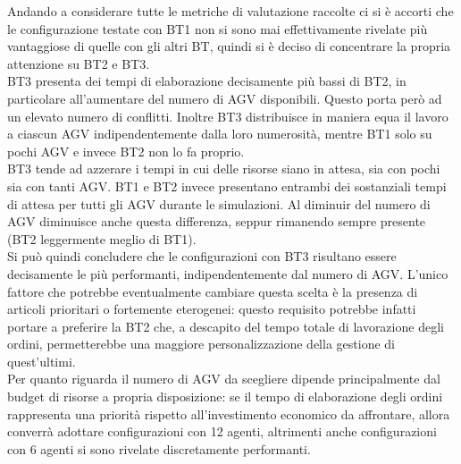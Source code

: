 \documentclass[12pt]{article}
\begin{document}
\noindent Andando a considerare tutte le metriche di valutazione raccolte ci si è accorti che le configurazione testate con BT1 non si sono mai effettivamente rivelate più vantaggiose di quelle con gli altri BT, quindi si è deciso di concentrare la propria attenzione su BT2 e BT3. \\

\noindent BT3 presenta dei tempi di elaborazione decisamente più bassi di BT2, in particolare all'aumentare del numero di AGV disponibili. Questo porta però ad un elevato numero di conflitti.
Inoltre BT3 distribuisce in maniera equa il lavoro a ciascun AGV indipendentemente dalla loro numerosità, mentre BT1 solo su pochi AGV e invece BT2 non lo fa proprio.\\
\noindent BT3 tende ad azzerare i tempi in cui delle risorse siano in attesa, sia con pochi sia con tanti AGV. BT1 e BT2 invece presentano entrambi dei sostanziali tempi di attesa per tutti gli AGV durante le simulazioni. Al diminuir del numero di AGV diminuisce anche questa differenza, seppur rimanendo sempre presente (BT2 leggermente meglio di BT1).\\

\noindent Si può quindi concludere che le configurazioni con BT3 risultano essere decisamente le più performanti, indipendentemente dal numero di AGV. L'unico fattore che potrebbe eventualmente cambiare questa scelta è la presenza di articoli prioritari o fortemente eterogenei: questo requisito potrebbe infatti portare a preferire la BT2 che, a descapito del tempo totale di lavorazione degli ordini, permetterebbe una maggiore personalizzazione della gestione di quest'ultimi.\\

\noindent Per quanto riguarda il numero di AGV da scegliere dipende principalmente dal budget di risorse a propria disposizione: se il tempo di elaborazione degli ordini rappresenta una priorità rispetto all'investimento economico da affrontare, allora converrà adottare configurazioni con 12 agenti, altrimenti anche configurazioni con 6 agenti si sono rivelate discretamente performanti.

\newpage
\end{document}
